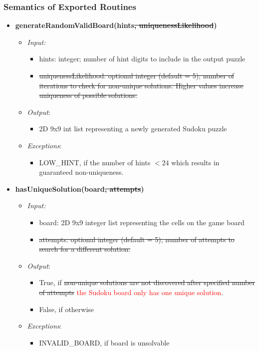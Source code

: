 \documentclass[11pt]{article}
\begin{document}
		\subsubsection{Semantics of Exported Routines}
		\begin{itemize}
		    \item \textbf{generateRandomValidBoard(hints\sout{, uniquenessLikelihood})}
		\begin{itemize}
		    \item[] \textit{Input: }
			\begin{itemize}
		        \item hints: integer; number of hint digits to include in the output puzzle
		        \item \sout{uniquenessLikelihood: optional integer (default = 5); number of iterations to check for non-unique solutions. Higher values increase uniqueness of possible solutions.}
		    \end{itemize}	    
		    
		    \item[] \textit{Output}: 
		    \begin{itemize}
		        \item 2D 9x9 int list representing a newly generated Sudoku puzzle
		    \end{itemize}
		    \item[] \textit{Exceptions}: 
			 \begin{itemize}
		        \item LOW\_HINT, if the number of hints $< 24$ which results in guaranteed non-uniqueness.
		    \end{itemize}	    
		\end{itemize}
		
	    \item \textbf{hasUniqueSolution(board\sout{, attempts})}
		\begin{itemize}
		    \item[] \textit{Input: } 
		    \begin{itemize}
		        \item board: 2D 9x9 integer list representing the cells on the game board
		        \item \sout{attempts: optional integer (default = 5); number of attempts to search for a different solution.}
		    \end{itemize}	  
		    \item[] \textit{Output}: 
		    \begin{itemize}
		        \item True, if \sout{non-unique solutions are not discovered after specified number of attempts} \textcolor{red}{the Sudoku board only has one unique solution}.
		        \item False, if otherwise
		    \end{itemize}
		    \item[] \textit{Exceptions}:
		    \begin{itemize}
		        \item INVALID\_BOARD, if board is unsolvable
		    \end{itemize}
		\end{itemize}
    \end{itemize}
    
\end{document}
